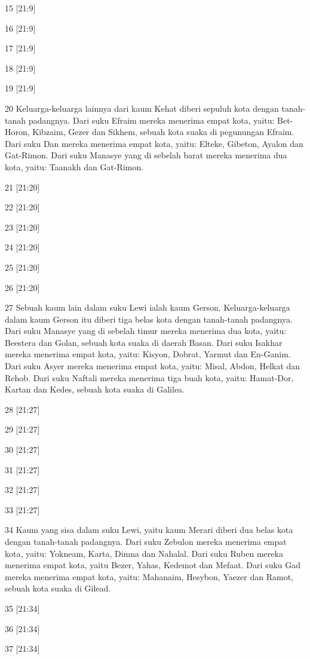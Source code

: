 \par 15 [21:9]
\par 16 [21:9]
\par 17 [21:9]
\par 18 [21:9]
\par 19 [21:9]
\par 20 Keluarga-keluarga lainnya dari kaum Kehat diberi sepuluh kota dengan tanah-tanah padangnya. Dari suku Efraim mereka menerima empat kota, yaitu: Bet-Horon, Kibzaim, Gezer dan Sikhem, sebuah kota suaka di pegunungan Efraim. Dari suku Dan mereka menerima empat kota, yaitu: Elteke, Gibeton, Ayalon dan Gat-Rimon. Dari suku Manasye yang di sebelah barat mereka menerima dua kota, yaitu: Taanakh dan Gat-Rimon.
\par 21 [21:20]
\par 22 [21:20]
\par 23 [21:20]
\par 24 [21:20]
\par 25 [21:20]
\par 26 [21:20]
\par 27 Sebuah kaum lain dalam suku Lewi ialah kaum Gerson. Keluarga-keluarga dalam kaum Gerson itu diberi tiga belas kota dengan tanah-tanah padangnya. Dari suku Manasye yang di sebelah timur mereka menerima dua kota, yaitu: Beestera dan Golan, sebuah kota suaka di daerah Basan. Dari suku Isakhar mereka menerima empat kota, yaitu: Kisyon, Dobrat, Yarmut dan En-Ganim. Dari suku Asyer mereka menerima empat kota, yaitu: Misal, Abdon, Helkat dan Rehob. Dari suku Naftali mereka menerima tiga buah kota, yaitu: Hamat-Dor, Kartan dan Kedes, sebuah kota suaka di Galilea.
\par 28 [21:27]
\par 29 [21:27]
\par 30 [21:27]
\par 31 [21:27]
\par 32 [21:27]
\par 33 [21:27]
\par 34 Kaum yang sisa dalam suku Lewi, yaitu kaum Merari diberi dua belas kota dengan tanah-tanah padangnya. Dari suku Zebulon mereka menerima empat kota, yaitu: Yokneam, Karta, Dimna dan Nahalal. Dari suku Ruben mereka menerima empat kota, yaitu Bezer, Yahas, Kedemot dan Mefaat. Dari suku Gad mereka menerima empat kota, yaitu: Mahanaim, Hesybon, Yaezer dan Ramot, sebuah kota suaka di Gilead.
\par 35 [21:34]
\par 36 [21:34]
\par 37 [21:34]

